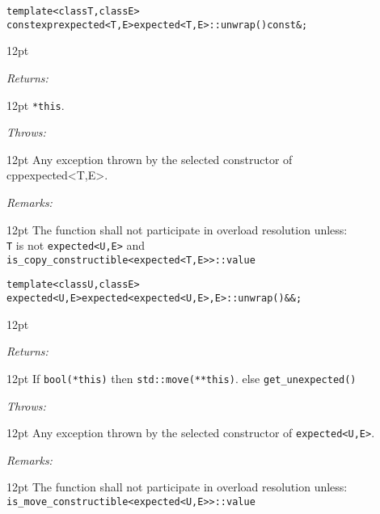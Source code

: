 \documentclass[a4paper,10pt]{article}
\newcommand{\cpp}[1]{\lstinline{#1}}
\newcommand{\wordingItem}[1]{\noindent\textit{#1:}}
\newenvironment{wordingTextItem}[1]{\wordingItem{#1}\vspace{2pt}\noindent\begin{adjustwidth}{12pt}{}}{\vspace{2pt}\end{adjustwidth}}
\newenvironment{wordingPara}{\begin{adjustwidth}{12pt}{}}{\end{adjustwidth}}
\begin{document}
\begin{alltt}
    template <class T, class E>
    constexpr expected<T,E> expected<T,E>::unwrap() const&;
\end{alltt}

\begin{wordingPara}

\begin{wordingTextItem}{Returns}
\cpp{*this}.
\end{wordingTextItem}

\begin{wordingTextItem}{Throws}
Any exception thrown by the selected constructor of \\cpp{expected<T,E>}.
\end{wordingTextItem}

\begin{wordingTextItem}{Remarks}
The function shall not participate in overload resolution unless: \\
\cpp{T} is not  \cpp{expected<U,E>}  and \\
\cpp{is_copy_constructible<expected<T,E>>::value} \\
\end{wordingTextItem}

\end{wordingPara}

\begin{alltt}
    template <class U, class E>
    expected<U,E> expected<expected<U,E>, E>::unwrap() &&;
\end{alltt}

\begin{wordingPara}

\begin{wordingTextItem}{Returns}
If \cpp{bool(*this)} then \cpp{std::move(**this)}.
else \cpp{get_unexpected()}
\end{wordingTextItem}

\begin{wordingTextItem}{Throws}
Any exception thrown by the selected constructor of \cpp{expected<U,E>}.
\end{wordingTextItem}

\begin{wordingTextItem}{Remarks}
The function shall not participate in overload resolution unless: \\
\cpp{is_move_constructible<expected<U,E>>::value} \\
\end{wordingTextItem}

\end{wordingPara}
\end{document}
